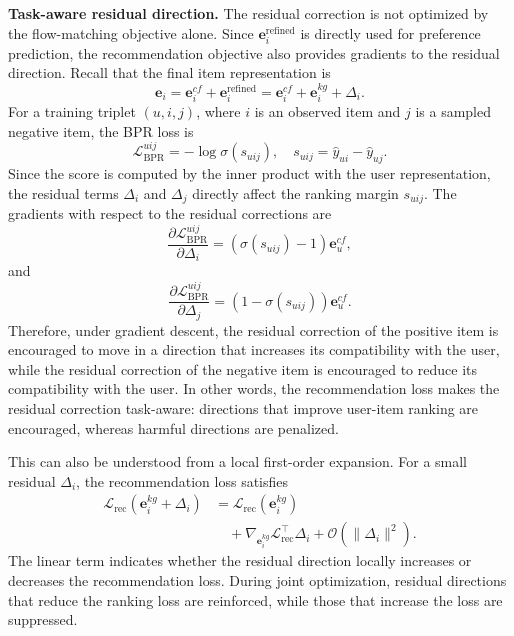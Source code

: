 \noindent\textbf{Task-aware residual direction.}
The residual correction is not optimized by the flow-matching objective alone. Since \(\mathbf{e}_i^{\mathrm{refined}}\) is directly used for preference prediction, the recommendation objective also provides gradients to the residual direction. Recall that the final item representation is
\[
\mathbf{e}_i
=
\mathbf{e}_i^{cf}
+
\mathbf{e}_i^{\mathrm{refined}}
=
\mathbf{e}_i^{cf}
+
\mathbf{e}_i^{kg}
+
\Delta_i .
\]
For a training triplet \((u,i,j)\), where \(i\) is an observed item and \(j\) is a sampled negative item, the BPR loss is
\begin{equation}
	\label{eq:app_bpr_triplet}
	\mathcal{L}_{\mathrm{BPR}}^{uij}
	=
	-\log \sigma(s_{uij}),
	\quad
	s_{uij}
	=
	\hat{y}_{ui}
	-
	\hat{y}_{uj}.
\end{equation}
Since the score is computed by the inner product with the user representation, the residual terms \(\Delta_i\) and \(\Delta_j\) directly affect the ranking margin \(s_{uij}\). The gradients with respect to the residual corrections are
\begin{equation}
	\label{eq:app_bpr_grad_pos}
	\frac{\partial \mathcal{L}_{\mathrm{BPR}}^{uij}}
	{\partial \Delta_i}
	=
	(\sigma(s_{uij})-1)\mathbf{e}_u^{cf},
\end{equation}
and
\begin{equation}
	\label{eq:app_bpr_grad_neg}
	\frac{\partial \mathcal{L}_{\mathrm{BPR}}^{uij}}
	{\partial \Delta_j}
	=
	(1-\sigma(s_{uij}))\mathbf{e}_u^{cf}.
\end{equation}
Therefore, under gradient descent, the residual correction of the positive item is encouraged to move in a direction that increases its compatibility with the user, while the residual correction of the negative item is encouraged to reduce its compatibility with the user. In other words, the recommendation loss makes the residual correction task-aware: directions that improve user-item ranking are encouraged, whereas harmful directions are penalized.

This can also be understood from a local first-order expansion. For a small residual \(\Delta_i\), the recommendation loss satisfies
\begin{equation}
	\label{eq:app_flow_first_order}
	\begin{aligned}
		\mathcal{L}_{\mathrm{rec}}(\mathbf{e}_i^{kg}+\Delta_i)
		&=
		\mathcal{L}_{\mathrm{rec}}(\mathbf{e}_i^{kg}) \\
		&\quad+
		\nabla_{\mathbf{e}_i^{kg}}\mathcal{L}_{\mathrm{rec}}^{\top}\Delta_i
		+
		\mathcal{O}(\|\Delta_i\|^2).
	\end{aligned}
\end{equation}
The linear term indicates whether the residual direction locally increases or decreases the recommendation loss. During joint optimization, residual directions that reduce the ranking loss are reinforced, while those that increase the loss are suppressed.

